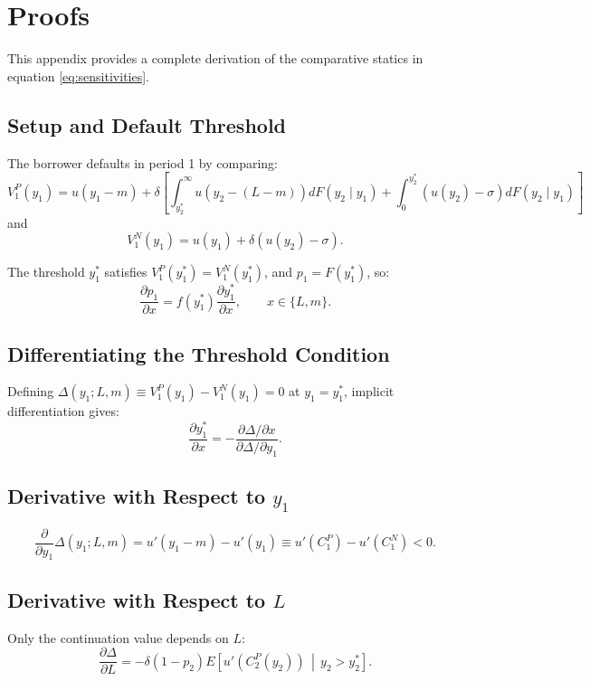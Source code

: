 \documentclass[12pt,english]{article}
\begin{document}
\section{Proofs}
\label{appendix:proofs}

This appendix provides a complete derivation of the comparative statics in equation \eqref{eq:sensitivities}.

\subsection{Setup and Default Threshold}

The borrower defaults in period 1 by comparing:
\[
V_1^P(y_1) = u(y_1 - m) +
\delta \left[
\int_{y_2^*}^\infty u(y_2 - (L-m)) dF(y_2 \mid y_1)
+
\int_0^{y_2^*} (u(y_2) - \sigma) dF(y_2 \mid y_1)
\right]
\]
and
\[
V_1^N(y_1) = u(y_1) + \delta (u(y_2) - \sigma).
\]

The threshold $y_1^*$ satisfies $V_1^P(y_1^*) = V_1^N(y_1^*)$, and $p_1 = F(y_1^*)$, so:
\begin{equation}
\frac{\partial p_1}{\partial x} = f(y_1^*) \frac{\partial y_1^*}{\partial x},
\qquad x \in \{L,m\}.
\label{eq:pchain}
\end{equation}

\subsection{Differentiating the Threshold Condition}

Defining $\Delta(y_1;L,m) \equiv V_1^P(y_1) - V_1^N(y_1) = 0$ at $y_1 = y_1^*$, implicit differentiation gives:
\[
\frac{\partial y_1^*}{\partial x}
=
- \frac{\partial \Delta / \partial x}{\partial \Delta / \partial y_1}.
\]

\subsection{Derivative with Respect to $y_1$}
\[
\frac{\partial}{\partial y_1} \Delta(y_1;L,m)
=
u'(y_1 - m) - u'(y_1)
\equiv u'(C_1^P) - u'(C_1^N) < 0.
\]

\subsection{Derivative with Respect to $L$}

Only the continuation value depends on $L$:
\[
\frac{\partial \Delta}{\partial L}
=
-\delta (1-p_2)
E\!\left[ u'(C_2^P(y_2)) \,\middle|\, y_2 > y_2^* \right].
\]
\end{document}

